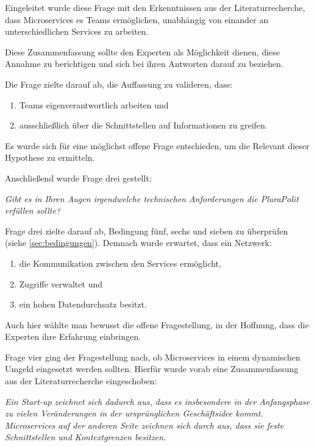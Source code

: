 Eingeleitet wurde diese Frage mit den Erkenntnissen aus der Literaturrecherche, dass Microservices es Teams ermöglichen, unabhängig von einander an unterschiedlichen Services zu arbeiten.

Diese Zusammenfassung sollte den Experten als Möglichkeit dienen, diese Annahme zu berichtigen und sich bei ihren Antworten darauf zu beziehen.

Die Frage zielte darauf ab, die Auffassung zu valideren, dass:
\begin{enumerate}
	\item Teams eigenverantwortlich arbeiten und
	\item ausschließlich über die Schnittstellen auf Informationen zu greifen.
\end{enumerate}
Es wurde sich für eine möglichst offene Frage entschieden, um die Relevant dieser Hypothese zu ermitteln.


Anschließend wurde Frage drei gestellt:

\textit{Gibt es in Ihren Augen irgendwelche technischen Anforderungen die PluraPolit erfüllen sollte? }

Frage drei zielte darauf ab, Bedingung fünf, sechs und sieben zu überprüfen (siehe \cref{sec:bedingungen}). Demnach wurde erwartet, dass ein Netzwerk: 

\begin{enumerate}
	\item die Kommunikation zwischen den Services ermöglicht,
	\item Zugriffe verwaltet und
	\item ein hohen Datendurchsatz besitzt.
\end{enumerate}

Auch hier wählte man bewusst die offene Fragestellung, in der Hoffnung, dass die Experten ihre Erfahrung einbringen.

Frage vier ging der Fragestellung nach, ob Microservices in einem dynamischen Umgeld eingesetzt werden sollten. Hierfür wurde vorab eine Zusammenfassung aus der Literaturrecherche eingeschoben:

\textit{Ein Start-up zeichnet sich dadurch aus, dass es insbesondere in der Anfangsphase zu vielen Veränderungen in der ursprünglichen Geschäftsidee kommt. Microservices auf der anderen Seite zeichnen sich durch aus, dass sie feste Schnittstellen und Kontextgrenzen besitzen.}

